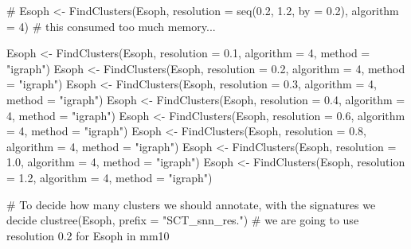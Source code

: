 \documentclass[
  letterpaper,
  DIV=11,
  numbers=noendperiod]{scrreprt}
\newenvironment{Shaded}{\begin{snugshade}}{\end{snugshade}}
\newcommand{\AttributeTok}[1]{\textcolor[rgb]{0.40,0.45,0.13}{#1}}
\newcommand{\CommentTok}[1]{\textcolor[rgb]{0.37,0.37,0.37}{#1}}
\newcommand{\DecValTok}[1]{\textcolor[rgb]{0.68,0.00,0.00}{#1}}
\newcommand{\FloatTok}[1]{\textcolor[rgb]{0.68,0.00,0.00}{#1}}
\newcommand{\FunctionTok}[1]{\textcolor[rgb]{0.28,0.35,0.67}{#1}}
\newcommand{\NormalTok}[1]{\textcolor[rgb]{0.00,0.23,0.31}{#1}}
\newcommand{\OtherTok}[1]{\textcolor[rgb]{0.00,0.23,0.31}{#1}}
\newcommand{\StringTok}[1]{\textcolor[rgb]{0.13,0.47,0.30}{#1}}
\begin{document}
\begin{Shaded}
\begin{Highlighting}[]
\CommentTok{\# Esoph \textless{}{-} FindClusters(Esoph, resolution = seq(0.2, 1.2, by = 0.2), algorithm = 4) \# this consumed too much memory...}

\NormalTok{Esoph }\OtherTok{\textless{}{-}} \FunctionTok{FindClusters}\NormalTok{(Esoph, }\AttributeTok{resolution =} \FloatTok{0.1}\NormalTok{, }\AttributeTok{algorithm =} \DecValTok{4}\NormalTok{, }\AttributeTok{method =} \StringTok{"igraph"}\NormalTok{) }
\NormalTok{Esoph }\OtherTok{\textless{}{-}} \FunctionTok{FindClusters}\NormalTok{(Esoph, }\AttributeTok{resolution =} \FloatTok{0.2}\NormalTok{, }\AttributeTok{algorithm =} \DecValTok{4}\NormalTok{, }\AttributeTok{method =} \StringTok{"igraph"}\NormalTok{) }
\NormalTok{Esoph }\OtherTok{\textless{}{-}} \FunctionTok{FindClusters}\NormalTok{(Esoph, }\AttributeTok{resolution =} \FloatTok{0.3}\NormalTok{, }\AttributeTok{algorithm =} \DecValTok{4}\NormalTok{, }\AttributeTok{method =} \StringTok{"igraph"}\NormalTok{) }
\NormalTok{Esoph }\OtherTok{\textless{}{-}} \FunctionTok{FindClusters}\NormalTok{(Esoph, }\AttributeTok{resolution =} \FloatTok{0.4}\NormalTok{, }\AttributeTok{algorithm =} \DecValTok{4}\NormalTok{, }\AttributeTok{method =} \StringTok{"igraph"}\NormalTok{) }
\NormalTok{Esoph }\OtherTok{\textless{}{-}} \FunctionTok{FindClusters}\NormalTok{(Esoph, }\AttributeTok{resolution =} \FloatTok{0.6}\NormalTok{, }\AttributeTok{algorithm =} \DecValTok{4}\NormalTok{, }\AttributeTok{method =} \StringTok{"igraph"}\NormalTok{) }
\NormalTok{Esoph }\OtherTok{\textless{}{-}} \FunctionTok{FindClusters}\NormalTok{(Esoph, }\AttributeTok{resolution =} \FloatTok{0.8}\NormalTok{, }\AttributeTok{algorithm =} \DecValTok{4}\NormalTok{, }\AttributeTok{method =} \StringTok{"igraph"}\NormalTok{) }
\NormalTok{Esoph }\OtherTok{\textless{}{-}} \FunctionTok{FindClusters}\NormalTok{(Esoph, }\AttributeTok{resolution =} \FloatTok{1.0}\NormalTok{, }\AttributeTok{algorithm =} \DecValTok{4}\NormalTok{, }\AttributeTok{method =} \StringTok{"igraph"}\NormalTok{) }
\NormalTok{Esoph }\OtherTok{\textless{}{-}} \FunctionTok{FindClusters}\NormalTok{(Esoph, }\AttributeTok{resolution =} \FloatTok{1.2}\NormalTok{, }\AttributeTok{algorithm =} \DecValTok{4}\NormalTok{, }\AttributeTok{method =} \StringTok{"igraph"}\NormalTok{) }
\end{Highlighting}
\end{Shaded}

\begin{Shaded}
\begin{Highlighting}[]
\CommentTok{\# To decide how many clusters we should annotate, with the signatures we decide}
\FunctionTok{clustree}\NormalTok{(Esoph, }\AttributeTok{prefix =} \StringTok{"SCT\_snn\_res."}\NormalTok{) }\CommentTok{\# we are going to use resolution 0.2 for Esoph in mm10}
\end{Highlighting}
\end{Shaded}
\end{document}
